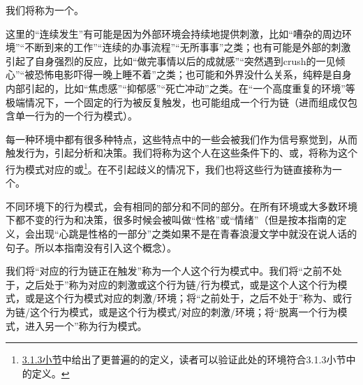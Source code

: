 \noindent 我们将称为一个。%
\begin{examples}
这里的“连续发生”有可能是因为外部环境会持续地提供刺激，比如“嘈杂的周边环境”“不断到来的工作”“连续的办事流程”“无所事事”之类；也有可能是外部的刺激引起了自身强烈的反应，比如“做完事情以后的成就感”“突然遇到crush的一见倾心”“被恐怖电影吓得一晚上睡不着”之类；也可能和外界没什么关系，纯粹是自身内部引起的，比如“焦虑感”“抑郁感”“死亡冲动”之类。在“一个高度重复的环境”等极端情况下，一个固定的行为被反复触发，也可能组成一个行为链（进而组成仅包含单一行为的一个行为模式）。
\end{examples}
每一种环境中都有很多种特点，这些特点中的一些会被我们作为信号察觉到，从而触发行为，引起分析和决策。我们将称为这个人在这些条件下的、或，将称为这个行为模式对应的或\footnote{\hyperref[sec:能力边界]{3.1.3小节}中给出了更普遍的的定义，读者可以验证此处的环境符合3.1.3小节中的定义。}。在不引起歧义的情况下，我们也将这些行为链直接称为一个。
\begin{explain}
不同环境下的行为模式，会有相同的部分和不同的部分。在所有环境或大多数环境下都不变的行为和决策，很多时候会被叫做“性格”或“情绪”（但是按本指南的定义，会出现“心跳是性格的一部分”之类如果不是在青春浪漫文学中就没在说人话的句子。所以本指南没有引入这个概念）。
\end{explain}
我们将“对应的行为链正在触发”称为一个人这个行为模式中。我们将“之前不处于，之后处于”称为对应的刺激或这个行为链/行为模式，或是这个人这个行为模式，或是这个行为模式对应的刺激/环境；将“之前处于，之后不处于”称为、或行为链/这个行为模式，或是这个行为模式/对应的刺激/环境；将“脱离一个行为模式，进入另一个”称为行为模式。

